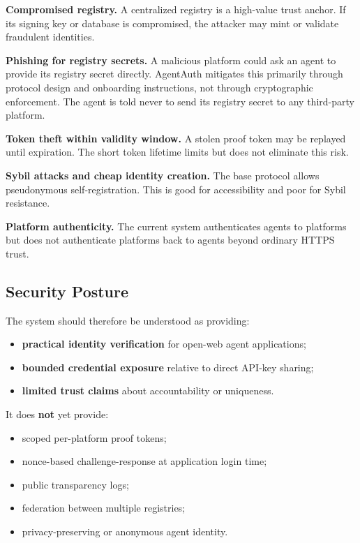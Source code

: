 \documentclass[11pt]{article}
\begin{document}
\textbf{Compromised registry.} A centralized registry is a high-value trust anchor. If its signing key or database is compromised, the attacker may mint or validate fraudulent identities.

\textbf{Phishing for registry secrets.} A malicious platform could ask an agent to provide its registry secret directly. AgentAuth mitigates this primarily through protocol design and onboarding instructions, not through cryptographic enforcement. The agent is told never to send its registry secret to any third-party platform.

\textbf{Token theft within validity window.} A stolen proof token may be replayed until expiration. The short token lifetime limits but does not eliminate this risk.

\textbf{Sybil attacks and cheap identity creation.} The base protocol allows pseudonymous self-registration. This is good for accessibility and poor for Sybil resistance.

\textbf{Platform authenticity.} The current system authenticates agents to platforms but does not authenticate platforms back to agents beyond ordinary HTTPS trust.

\subsection{Security Posture}

The system should therefore be understood as providing:

\begin{itemize}
  \item \textbf{practical identity verification} for open-web agent applications;
  \item \textbf{bounded credential exposure} relative to direct API-key sharing;
  \item \textbf{limited trust claims} about accountability or uniqueness.
\end{itemize}

It does \textbf{not} yet provide:

\begin{itemize}
  \item scoped per-platform proof tokens;
  \item nonce-based challenge-response at application login time;
  \item public transparency logs;
  \item federation between multiple registries;
  \item privacy-preserving or anonymous agent identity.
\end{itemize}
\end{document}
